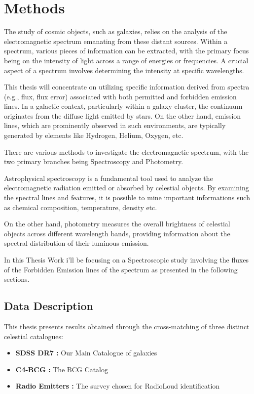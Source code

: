 \chapter{Methods}
The study of cosmic objects, such as galaxies, relies on the analysis of the electromagnetic spectrum emanating from these distant sources. Within a spectrum, various pieces of information can be extracted, with the primary focus being on the intensity of light across a range of energies or frequencies. A crucial aspect of a spectrum involves determining the intensity at specific wavelengths.

This thesis will concentrate on utilizing specific information derived from spectra (e.g., flux, flux error) associated with both permitted and forbidden emission lines. In a galactic context, particularly within a galaxy cluster, the continuum originates from the diffuse light emitted by stars. On the other hand, emission lines, which are prominently observed in such environments, are typically generated by elements like Hydrogen, Helium, Oxygen, etc.

There are various methods to investigate the electromagnetic spectrum, with the two primary branches being Spectroscopy and Photometry.

Astrophysical spectroscopy is a fundamental tool used to analyze the electromagnetic radiation emitted or absorbed by celestial objects. By examining the spectral lines and features, it is possible to mine important informations such as chemical composition, temperature, density etc.

On the other hand, photometry measures the overall brightness of celestial objects across different wavelength bands, providing information about the spectral distribution of their luminous emission. 

In this Thesis Work i'll be focusing on a Spectroscopic study involving the fluxes of the Forbidden Emission lines of the spectrum as presented in the following sections.

\section{Data Description}
This thesis presents results obtained through the cross-matching of three distinct celestial catalogues:
\begin{itemize}
	\item\textbf{SDSS DR7 :} Our Main Catalogue of galaxies
	\item \textbf{C4-BCG :} The BCG Catalog 
	\item \textbf{Radio Emitters :}  The survey chosen for RadioLoud identification
\end{itemize}

